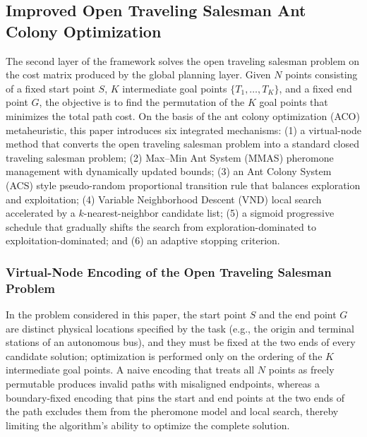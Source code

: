 \subsection{Improved Open Traveling Salesman Ant Colony Optimization}
\label{subsec:aco}

The second layer of the framework solves the open traveling salesman problem on the cost matrix produced by the global planning layer. Given $N$ points consisting of a fixed start point $S$, $K$ intermediate goal points $\{T_1, \dots, T_K\}$, and a fixed end point $G$, the objective is to find the permutation of the $K$ goal points that minimizes the total path cost. On the basis of the ant colony optimization (ACO) metaheuristic, this paper introduces six integrated mechanisms: (1) a virtual-node method that converts the open traveling salesman problem into a standard closed traveling salesman problem; (2) Max--Min Ant System (MMAS) pheromone management with dynamically updated bounds; (3) an Ant Colony System (ACS) style pseudo-random proportional transition rule that balances exploration and exploitation; (4) Variable Neighborhood Descent (VND) local search accelerated by a $k$-nearest-neighbor candidate list; (5) a sigmoid progressive schedule that gradually shifts the search from exploration-dominated to exploitation-dominated; and (6) an adaptive stopping criterion.

\subsubsection{Virtual-Node Encoding of the Open Traveling Salesman Problem}
\label{subsec:virtual}

In the problem considered in this paper, the start point $S$ and the end point $G$ are distinct physical locations specified by the task (e.g., the origin and terminal stations of an autonomous bus), and they must be fixed at the two ends of every candidate solution; optimization is performed only on the ordering of the $K$ intermediate goal points. A naive encoding that treats all $N$ points as freely permutable produces invalid paths with misaligned endpoints, whereas a boundary-fixed encoding that pins the start and end points at the two ends of the path excludes them from the pheromone model and local search, thereby limiting the algorithm's ability to optimize the complete solution.

